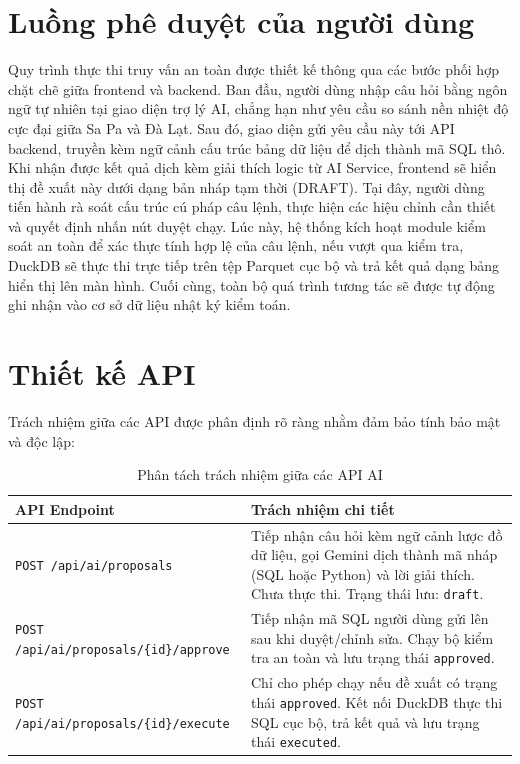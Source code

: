 \section{Luồng phê duyệt của người dùng}
Quy trình thực thi truy vấn an toàn được thiết kế thông qua các bước phối hợp chặt chẽ giữa frontend và backend. Ban đầu, người dùng nhập câu hỏi bằng ngôn ngữ tự nhiên tại giao diện trợ lý AI, chẳng hạn như yêu cầu so sánh nền nhiệt độ cực đại giữa Sa Pa và Đà Lạt. Sau đó, giao diện gửi yêu cầu này tới API backend, truyền kèm ngữ cảnh cấu trúc bảng dữ liệu để dịch thành mã SQL thô. Khi nhận được kết quả dịch kèm giải thích logic từ AI Service, frontend sẽ hiển thị đề xuất này dưới dạng bản nháp tạm thời (DRAFT). Tại đây, người dùng tiến hành rà soát cấu trúc cú pháp câu lệnh, thực hiện các hiệu chỉnh cần thiết và quyết định nhấn nút duyệt chạy. Lúc này, hệ thống kích hoạt module kiểm soát an toàn để xác thực tính hợp lệ của câu lệnh, nếu vượt qua kiểm tra, DuckDB sẽ thực thi trực tiếp trên tệp Parquet cục bộ và trả kết quả dạng bảng hiển thị lên màn hình. Cuối cùng, toàn bộ quá trình tương tác sẽ được tự động ghi nhận vào cơ sở dữ liệu nhật ký kiểm toán.

\section{Thiết kế API}
Trách nhiệm giữa các API được phân định rõ ràng nhằm đảm bảo tính bảo mật và độc lập:
\begin{table}[htbp]
\centering
\renewcommand{\arraystretch}{1.25}
\begin{tabularx}{\textwidth}{|p{}|X|}
\hline
\textbf{API Endpoint} & \textbf{Trách nhiệm chi tiết} \\ \hline
\texttt{POST /api/ai/}\newline\texttt{proposals} & Tiếp nhận câu hỏi kèm ngữ cảnh lược đồ dữ liệu, gọi Gemini dịch thành mã nháp (SQL hoặc Python) và lời giải thích. Chưa thực thi. Trạng thái lưu: \texttt{draft}. \\ \hline
\texttt{POST /api/ai/}\newline\texttt{proposals/\{id\}/}\newline\texttt{approve} & Tiếp nhận mã SQL người dùng gửi lên sau khi duyệt/chỉnh sửa. Chạy bộ kiểm tra an toàn và lưu trạng thái \texttt{approved}. \\ \hline
\texttt{POST /api/ai/}\newline\texttt{proposals/\{id\}/}\newline\texttt{execute} & Chỉ cho phép chạy nếu đề xuất có trạng thái \texttt{approved}. Kết nối DuckDB thực thi SQL cục bộ, trả kết quả và lưu trạng thái \texttt{executed}. \\ \hline
\end{tabularx}
\caption{Phân tách trách nhiệm giữa các API AI}
\end{table}

